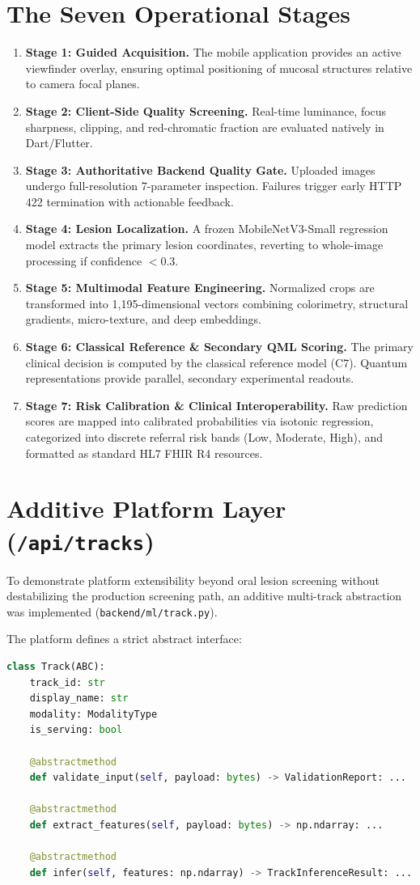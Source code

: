 \documentclass[11pt,a4paper]{report}
\newcommand{\artifact}[1]{\nolinkurl{#1}}
\begin{document}
\section{The Seven Operational Stages}
\begin{enumerate}
  \item \textbf{Stage 1: Guided Acquisition.} The mobile application provides an active viewfinder overlay, ensuring optimal positioning of mucosal structures relative to camera focal planes.
  \item \textbf{Stage 2: Client-Side Quality Screening.} Real-time luminance, focus sharpness, clipping, and red-chromatic fraction are evaluated natively in Dart/Flutter.
  \item \textbf{Stage 3: Authoritative Backend Quality Gate.} Uploaded images undergo full-resolution 7-parameter inspection. Failures trigger early HTTP 422 termination with actionable feedback.
  \item \textbf{Stage 4: Lesion Localization.} A frozen MobileNetV3-Small regression model extracts the primary lesion coordinates, reverting to whole-image processing if confidence $< 0.3$.
  \item \textbf{Stage 5: Multimodal Feature Engineering.} Normalized crops are transformed into 1,195-dimensional vectors combining colorimetry, structural gradients, micro-texture, and deep embeddings.
  \item \textbf{Stage 6: Classical Reference \& Secondary QML Scoring.} The primary clinical decision is computed by the classical reference model (C7). Quantum representations provide parallel, secondary experimental readouts.
  \item \textbf{Stage 7: Risk Calibration \& Clinical Interoperability.} Raw prediction scores are mapped into calibrated probabilities via isotonic regression, categorized into discrete referral risk bands (Low, Moderate, High), and formatted as standard HL7 FHIR R4 resources.
\end{enumerate}

\section{Additive Platform Layer (\texttt{/api/tracks})}
To demonstrate platform extensibility beyond oral lesion screening without destabilizing the production screening path, an additive multi-track abstraction was implemented (\artifact{backend/ml/track.py}). 

The platform defines a strict abstract interface:
\begin{lstlisting}[language=Python]
class Track(ABC):
    track_id: str
    display_name: str
    modality: ModalityType
    is_serving: bool
    
    @abstractmethod
    def validate_input(self, payload: bytes) -> ValidationReport: ...
    
    @abstractmethod
    def extract_features(self, payload: bytes) -> np.ndarray: ...
    
    @abstractmethod
    def infer(self, features: np.ndarray) -> TrackInferenceResult: ...
\end{lstlisting}
\end{document}
